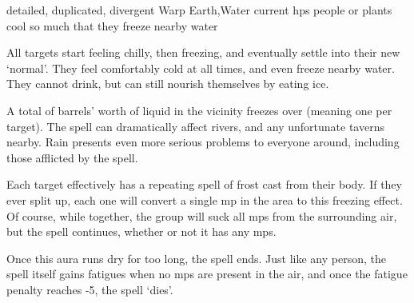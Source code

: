   {detailed, duplicated, divergent}%
  {Warp}%
  {Earth,Water}%
  {current \glspl{hp}}%
  { people or plants cool so much that they freeze nearby water}%
  {
    All  targets start feeling chilly, then freezing, and eventually settle into their new `normal'.
    They feel comfortably cold at all times, and even freeze nearby water.
    They cannot drink, but can still nourish themselves by eating ice.

    A total of  barrels' worth of liquid in the vicinity freezes over (meaning one per target).
    The spell can dramatically affect rivers, and any unfortunate taverns nearby.
    Rain presents even more serious problems to everyone around, including those afflicted by the spell.

    Each target effectively has a repeating spell of frost cast from their body.
    If they ever split up, each one will convert a single \gls{mp} in the area to this freezing effect.
    Of course, while together, the group will suck all \glspl{mp} from the surrounding air, but the spell continues, whether or not it has any \glspl{mp}.

    Once this aura runs dry for too long, the spell ends.
    Just like any person, the spell itself gains \glspl{fatigue} when no \glspl{mp} are present in the air, and once the \gls{fatigue} penalty reaches -5, the spell `dies'.
  }

